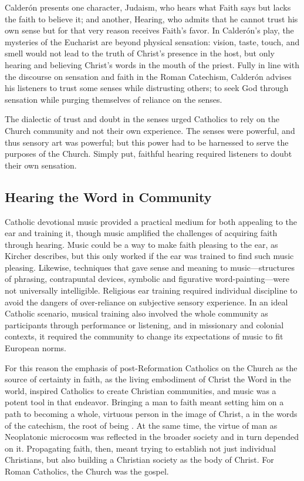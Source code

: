 Calderón presents one character, Judaism, who hears what Faith says but lacks the faith to believe it; and another, Hearing, who admits that he cannot trust his own sense but for that very reason receives Faith's favor.
In Calderón's play, the mysteries of the Eucharist are beyond physical sensation: vision, taste, touch, and smell would not lead to the truth of Christ's presence in the host, but only hearing and believing Christ's words  in the mouth of the priest.
Fully in line with the discourse on sensation and faith in the Roman Catechism, Calderón advises his listeners to trust some senses while distrusting others; to seek God through sensation while purging themselves of reliance on the senses.

The dialectic of trust and doubt in the senses urged Catholics to rely on the Church community and not their own experience.
The senses were powerful, and thus sensory art was powerful; but this power had to be harnessed to serve the purposes of the Church.
Simply put, faithful hearing required listeners to doubt their own sensation.


\subsection{Hearing the Word in Community}

Catholic devotional music provided a practical medium for both appealing to the ear and training it, though music amplified the challenges of acquiring faith through hearing.
Music could be a way to make faith pleasing to the ear, as Kircher  describes, but this only worked if the ear was trained to find such music pleasing.
Likewise, techniques that gave sense and meaning to music---structures of phrasing, contrapuntal devices, symbolic and figurative word-painting---were not universally intelligible.
Religious ear training required individual discipline to avoid the dangers of over-reliance on subjective sensory experience.
In an ideal Catholic scenario, musical training also involved the whole community as participants through performance or listening, and in missionary and colonial contexts, it required the community to change its expectations of music to fit European norms.

For this reason the emphasis of post-Reformation Catholics on the Church as the source of certainty in faith, as the living embodiment of Christ the Word in the world, inspired Catholics to create Christian communities, and music was a potent tool in that endeavor.
Bringing a man to faith meant setting him on a path to becoming a whole, virtuous person in the image of Christ, a  in the words of the catechism, the root of  being .%
\Autocite[8]{Catholic:Catechismus1614}
At the same time, the virtue of man as Neoplatonic microcosm was reflected in the broader society and in turn depended on it.
Propagating faith, then, meant trying to establish not just individual Christians, but also building a Christian society as the body of Christ.
For Roman Catholics, the Church was the gospel.

